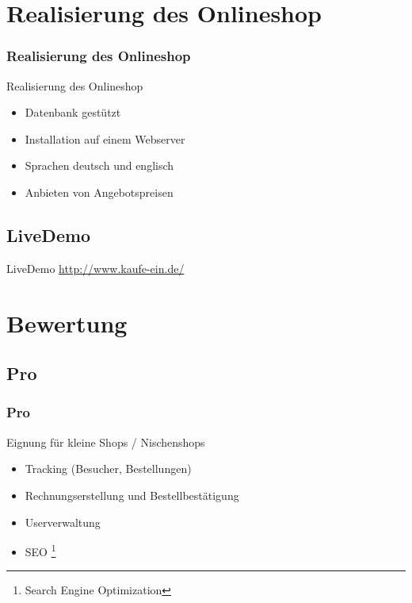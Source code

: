 \documentclass[xcolor=dvipsnames]{beamer}
\begin{document}
\section{Realisierung des Onlineshop}
\begin{frame} %
  \frametitle{Realisierung des Onlineshop} %
  \begin{block}{Realisierung des Onlineshop}
	  \begin{itemize}
		\item Datenbank gestützt
		\item Installation auf einem Webserver
		\item Sprachen deutsch und englisch
		\item Anbieten von Angebotspreisen
	  \end{itemize}
  \end{block}
\end{frame}

\subsection{LiveDemo}
\begin{frame} %
  \begin{block}{LiveDemo}
		\url{http://www.kaufe-ein.de/}
  \end{block}
\end{frame}

\section{Bewertung}
\begin{frame} %
\end{frame}

\subsection{Pro}
\begin{frame} %
  \frametitle{Pro} %
  \begin{block}{Eignung für kleine Shops / Nischenshops }
	  \begin{itemize}
		\item Tracking (Besucher, Bestellungen)
		\item Rechnungserstellung und Bestellbestätigung
		\item Userverwaltung
		\item SEO \footnote{Search Engine Optimization}
	  \end{itemize}
  \end{block}
\end{frame}
\end{document}
